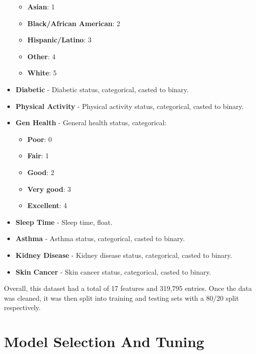 \begin{itemize}
\begin{itemize}
        \item \textbf{Asian}: 1
        \item \textbf{Black/African American}: 2
        \item \textbf{Hispanic/Latino}: 3
        \item \textbf{Other}: 4
        \item \textbf{White}: 5
    \end{itemize}
    \item \textbf{Diabetic} - Diabetic status, categorical, casted to binary.
    \item \textbf{Physical Activity} - Physical activity status, categorical, casted to binary.
    \item \textbf{Gen Health} - General health status, categorical:
    \begin{itemize}
        \item \textbf{Poor}: 0
        \item \textbf{Fair}: 1
        \item \textbf{Good}: 2
        \item \textbf{Very good}: 3
        \item \textbf{Excellent}: 4
    \end{itemize}
    \item \textbf{Sleep Time} - Sleep time, float.
    \item \textbf{Asthma} - Asthma status, categorical, casted to binary.
    \item \textbf{Kidney Disease} - Kidney disease status, categorical, casted to binary.
    \item \textbf{Skin Cancer} - Skin cancer status, categorical, casted to binary.
\end{itemize}

Overall, this dataset had a total of 17 features and 319,795 entries. Once the data was cleaned, it was then split into training and testing sets with a 80/20 split respectively.


\clearpage

\chapter{Model Selection And Tuning}

